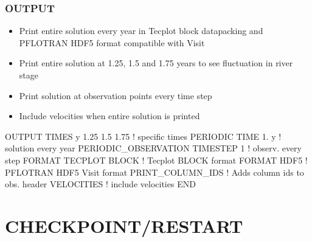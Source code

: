 \documentclass{beamer}
\newcommand\bluecomment[1]{{{\color{blue} #1}}}
\begin{document}
\begin{frame}[fragile]\frametitle{OUTPUT}

\begin{itemize}
\item Print entire solution every year in Tecplot block datapacking and PFLOTRAN HDF5 format compatible with Visit
\item Print entire solution at 1.25, 1.5 and 1.75 years to see fluctuation in river stage
\item Print solution at observation points every time step
\item Include velocities when entire solution is printed
\end{itemize}

\begin{semiverbatim}

OUTPUT
  TIMES y 1.25 1.5 1.75  \bluecomment{! specific times}
  PERIODIC TIME 1. y     \bluecomment{! solution every year}
  PERIODIC_OBSERVATION TIMESTEP 1  \bluecomment{! observ. every step}
  FORMAT TECPLOT BLOCK   \bluecomment{! Tecplot BLOCK format}
  FORMAT HDF5            \bluecomment{! PFLOTRAN HDF5 Visit format}
  PRINT_COLUMN_IDS       \bluecomment{! Adds column ids to obs. header}
  VELOCITIES             \bluecomment{! include velocities}
END
\end{semiverbatim}

\end{frame}

\section{CHECKPOINT/RESTART}
\end{document}
